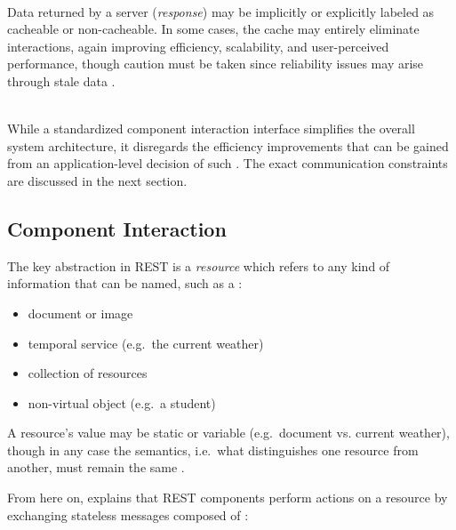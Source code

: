 \begin{appendices}
\begin{description}[format={\storedescriptionlabel}]
\newpage

	\item[Cache]
	\hfill \\
	Data returned by a server (\textit{response}) may be implicitly or explicitly labeled as cacheable or non-cacheable. In some cases, the cache may entirely eliminate interactions, again improving efficiency, scalability, and user-perceived performance, though caution must be taken since reliability issues may arise through stale data \cite[pp.~79--80]{fielding2000architectural}.

	\item[Uniform interface]
	\hfill \\
	While a standardized component interaction interface simplifies the overall system architecture, it disregards the efficiency improvements that can be gained from an application-level decision of such \cite[pp.~81--82]{fielding2000architectural}. The exact communication constraints are discussed in the next section.
\end{description}


\subsection{Component Interaction}
\label{sec:rest-component-interaction}

The key abstraction in \ac{REST} is a \textit{resource} which refers to any kind of information that can be named, such as a \cite[p.~88]{fielding2000architectural}:

\begin{itemize}
  \item document or image
  \item temporal service (e.g.~the current weather)
  \item collection of resources
  \item non-virtual object (e.g.~a student)
\end{itemize}

A resource's value may be static or variable (e.g.~document vs. current weather), though in any case the semantics, i.e.~what distinguishes one resource from another, must remain the same \cite[p.~89]{fielding2000architectural}.

From here on, \citeauthor{fielding2000architectural} explains that \ac{REST} components perform actions on a resource by exchanging stateless messages composed of \cite[pp.~90--91]{fielding2000architectural}:


\end{appendices}
